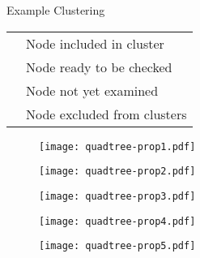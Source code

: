 \documentclass{beamer}
\begin{document}
\begin{frame}{Example Clustering}
	\begin{table}
		\begin{tabular}{l l}
			\cellcolor{lred}   & Node included in cluster \\
			\cellcolor{lblue}  & Node ready to be checked \\
			\phantom{one}      & Node not yet examined \\
			\cellcolor{silver} & Node excluded from clusters \\
		\end{tabular}
	\end{table}
\end{frame}

\begin{frame}
	\begin{figure}
		\texttt{[image: quadtree-prop1.pdf]}
	\end{figure}
\end{frame}

\begin{frame}
	\begin{figure}
		\texttt{[image: quadtree-prop2.pdf]}
	\end{figure}
\end{frame}

\begin{frame}
	\begin{figure}
		\texttt{[image: quadtree-prop3.pdf]}
	\end{figure}
\end{frame}

\begin{frame}
	\begin{figure}
		\texttt{[image: quadtree-prop4.pdf]}
	\end{figure}
\end{frame}

\begin{frame}
	\begin{figure}
		\texttt{[image: quadtree-prop5.pdf]}
	\end{figure}
\end{frame}

\begin{frame}
\end{frame}
\end{document}
